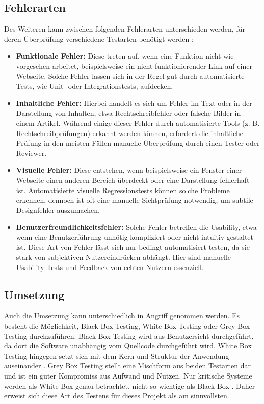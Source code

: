 \documentclass[a4paper,12pt]{article}
\begin{document}
\subsection{Fehlerarten}
Des Weiteren kann zwischen folgenden Fehlerarten unterschieden werden, für deren Überprüfung verschiedene Testarten benötigt werden \cite{eichstadt_testen_2024}:
\begin{itemize}
    \item \textbf{Funktionale Fehler:} Diese treten auf, wenn eine Funktion nicht wie vorgesehen arbeitet, beispielsweise ein nicht funktionierender Link auf einer Webseite. Solche Fehler lassen sich in der Regel gut durch automatisierte Tests, wie Unit- oder Integrationstests, aufdecken.
    \item \textbf{Inhaltliche Fehler:} Hierbei handelt es sich um Fehler im Text oder in der Darstellung von Inhalten, etwa Rechtschreibfehler oder falsche Bilder in einem Artikel. Während einige dieser Fehler durch automatisierte Tools (z. B. Rechtschreibprüfungen) erkannt werden können, erfordert die inhaltliche Prüfung in den meisten Fällen manuelle Überprüfung durch einen Tester oder Reviewer.
    \item \textbf{Visuelle Fehler:} Diese entstehen, wenn beispielsweise ein Fenster einer Webseite einen anderen Bereich überdeckt oder eine Darstellung fehlerhaft ist. Automatisierte visuelle Regressionstests können solche Probleme erkennen, dennoch ist oft eine manuelle Sichtprüfung notwendig, um subtile Designfehler auszumachen.
    \item \textbf{Benutzerfreundlichkeitsfehler:} Solche Fehler betreffen die Usability, etwa wenn eine Benutzerführung unnötig kompliziert oder nicht intuitiv gestaltet ist. Diese Art von Fehler lässt sich nur bedingt automatisiert testen, da sie stark von subjektiven Nutzereindrücken abhängt. Hier sind manuelle Usability-Tests und Feedback von echten Nutzern essenziell.
\end{itemize}

\subsection{Umsetzung}
Auch die Umsetzung kann unterschiedlich in Angriff genommen werden. Es besteht die Möglichkeit, Black Box Testing, White Box Testing oder Grey Box Testing durchzuführen. Black Box Testing wird aus Benutzersicht durchgeführt, da dort die Software unabhängig vom Quellcode durchgeführt wird. White Box Testing hingegen setzt sich mit dem Kern und Struktur der Anwendung auseinander \cite{gedik_schwarz_2023}. Grey Box Testing stellt eine Mischform aus beiden Testarten dar und ist ein guter Kompromiss aus Aufwand und Nutzen. Nur kritische Systeme werden als White Box genau betrachtet, nicht so wichtige als Black Box \cite{eichstadt_testen_2024}. Daher erweist sich diese Art des Testens für dieses Projekt als am sinnvollsten.
\end{document}
